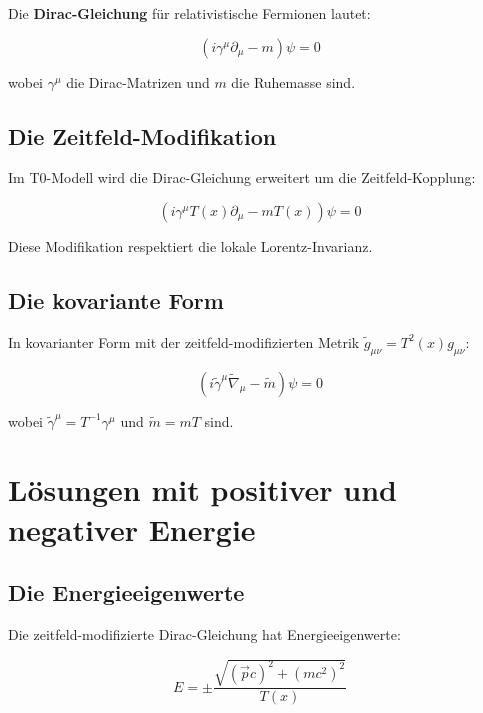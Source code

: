 \documentclass[12pt,a4paper]{report}
\begin{document}
	Die \textbf{Dirac-Gleichung} für relativistische Fermionen lautet:
	
	\begin{equation}
		(i\gamma^\mu\partial_\mu - m)\psi = 0
	\end{equation}
	
	wobei $\gamma^\mu$ die Dirac-Matrizen und $m$ die Ruhemasse sind.
	
	\subsection{Die Zeitfeld-Modifikation}
	
	Im T0-Modell wird die Dirac-Gleichung erweitert um die Zeitfeld-Kopplung:
	
	\begin{equation}
		\left(i\gamma^\mu T(x)\partial_\mu - m T(x)\right)\psi = 0
	\end{equation}
	
	Diese Modifikation respektiert die lokale Lorentz-Invarianz.
	
	\subsection{Die kovariante Form}
	
	In kovarianter Form mit der zeitfeld-modifizierten Metrik $\tilde{g}_{\mu\nu} = T^2(x) g_{\mu\nu}$:
	
	\begin{equation}
		\left(i\tilde{\gamma}^\mu\tilde{\nabla}_\mu - \tilde{m}\right)\psi = 0
	\end{equation}
	
	wobei $\tilde{\gamma}^\mu = T^{-1}\gamma^\mu$ und $\tilde{m} = mT$ sind.
	
	\section{Lösungen mit positiver und negativer Energie}
	
	\subsection{Die Energieeigenwerte}
	
	Die zeitfeld-modifizierte Dirac-Gleichung hat Energieeigenwerte:
	
	\begin{equation}
		E = \pm\frac{\sqrt{(\vec{p}c)^2 + (mc^2)^2}}{T(x)}
	\end{equation}
	
\end{document}
